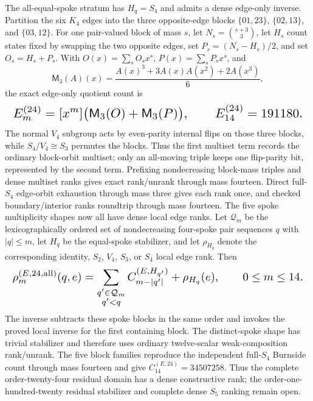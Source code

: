 \documentclass{article}
\newcommand{\fitmath}[1]{\resizebox{0.99\linewidth}{!}{$\displaystyle #1$}}
\begin{document}
The all-equal-spoke stratum has $H_q=S_4$ and admits a dense edge-only inverse.
Partition the six $K_4$ edges into the three opposite-edge blocks
$\{01,23\}$, $\{02,13\}$, and $\{03,12\}$. For one pair-valued block of
mass $s$, let $N_s=\binom{s+3}{3}$, let $H_s$ count states fixed by swapping the
two opposite edges, set $P_s=(N_s-H_s)/2$, and set $O_s=H_s+P_s$. With
$O(x)=\sum_{s} O_{s} x^{s}$, $P(x)=\sum_{s} P_{s} x^{s}$, and
\[
  \mathsf M_3(A)(x)=
    \frac{A(x)^3+3A(x)A(x^2)+2A(x^3)}{6},
\]
the exact edge-only quotient count is
\begin{equation}
  \fitmath{%
    E^{(24)}_m=[x^m]\bigl(\mathsf M_3(O)+\mathsf M_3(P)\bigr),
    \qquad E^{(24)}_{14}=191180.
  }
  \label{eq:optimization-crazy-preimage-cube-quintuple-s4-edge-core-ranking}
\end{equation}
The normal $V_4$ subgroup acts by even-parity internal flips on those three
blocks, while $S_4/V_4\cong S_3$ permutes the blocks. Thus the first multiset
term records the ordinary block-orbit multiset; only an all-moving triple keeps
one flip-parity bit, represented by the second term. Prefixing nondecreasing
block-mass triples and dense multiset ranks gives exact rank/unrank through mass
fourteen. Direct full-$S_4$ edge-orbit exhaustion through mass three gives each
rank once, and checked boundary/interior ranks roundtrip through mass fourteen.
The five spoke multiplicity shapes now all have dense local edge ranks. Let
$\mathcal Q_m$ be the lexicographically ordered set of nondecreasing four-spoke
pair sequences $q$ with $|q|\leq m$, let $H_q$ be the equal-spoke stabilizer,
and let $\rho_{H_q}$ denote the corresponding identity, $S_2$, $V_4$, $S_3$,
or $S_4$ local edge rank. Then
\begin{equation}
  \fitmath{%
    \rho^{(E,24,\mathrm{all})}_m(q,e)=
      \sum_{\substack{q'\in\mathcal Q_m\\q'<q}}
        C^{(E,H_{q'})}_{m-|q'|}
      +\rho_{H_q}(e),
    \qquad 0\leq m\leq14.
  }
  \label{eq:optimization-crazy-preimage-cube-quintuple-s4-residual-ranking}
\end{equation}
The inverse subtracts these spoke blocks in the same order and invokes the
proved local inverse for the first containing block. The distinct-spoke shape
has trivial stabilizer and therefore uses ordinary twelve-scalar
weak-composition rank/unrank. The five block families reproduce the independent
full-$S_4$ Burnside count through mass fourteen and give
$C^{(E,24)}_{14}=34507258$. Thus the complete order-twenty-four residual domain
has a dense constructive rank; the order-one-hundred-twenty residual stabilizer
and complete dense $S_5$ ranking remain open.
\end{document}
